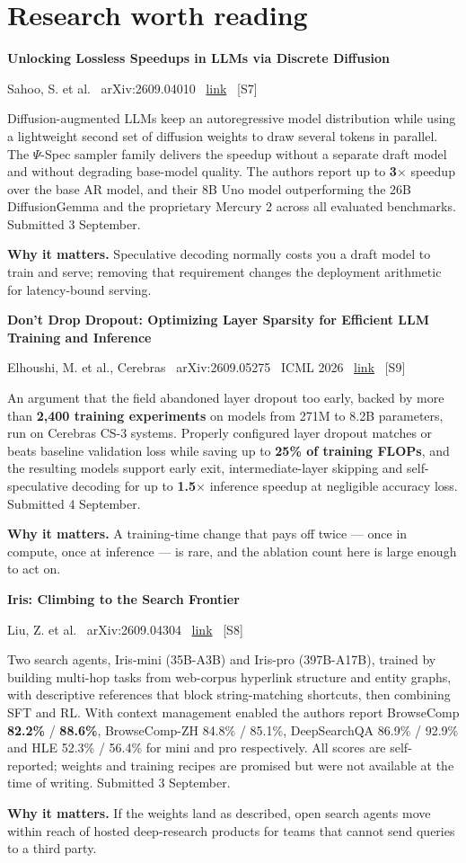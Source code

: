 \documentclass[11pt,a4paper]{article}
\newcommand{\entry}[4]{%
  \par\vspace{0.7em}%
  \Needspace*{5\baselineskip}%
  {\sffamily\bfseries\color{brandink}#1}\par
  {\footnotesize\color{brandgrey}#2 \textbullet\ \href{#3}{link} \textbullet\ \srcref{#4}}\par
  \vspace{0.15em}}
\newcommand{\why}[1]{\par{\small\textbf{Why it matters.} #1}\par}
\newcommand{\srcref}[1]{\textcolor{brandaccent}{[S#1]}}
\begin{document}
\section{Research worth reading}

\entry{Unlocking Lossless Speedups in LLMs via Discrete Diffusion}{Sahoo, S. et al. \textbullet\ arXiv:2609.04010}{https://arxiv.org/abs/2609.04010}{7}
Diffusion-augmented LLMs keep an autoregressive model distribution while using a
lightweight second set of diffusion weights to draw several tokens in parallel. The
$\Psi$-Spec sampler family delivers the speedup without a separate draft model and
without degrading base-model quality. The authors report up to \textbf{3$\times$} speedup
over the base AR model, and their 8B Uno model outperforming the 26B DiffusionGemma and
the proprietary Mercury 2 across all evaluated benchmarks. Submitted 3 September.
\why{Speculative decoding normally costs you a draft model to train and serve; removing
that requirement changes the deployment arithmetic for latency-bound serving.}

\entry{Don't Drop Dropout: Optimizing Layer Sparsity for Efficient LLM Training and Inference}{Elhoushi, M. et al., Cerebras \textbullet\ arXiv:2609.05275 \textbullet\ ICML 2026}{https://arxiv.org/abs/2609.05275}{9}
An argument that the field abandoned layer dropout too early, backed by more than
\textbf{2{,}400 training experiments} on models from 271M to 8.2B parameters, run on
Cerebras CS-3 systems. Properly configured layer dropout matches or beats baseline
validation loss while saving up to \textbf{25\% of training FLOPs}, and the resulting
models support early exit, intermediate-layer skipping and self-speculative decoding for
up to \textbf{1.5$\times$} inference speedup at negligible accuracy loss. Submitted
4 September.
\why{A training-time change that pays off twice --- once in compute, once at
inference --- is rare, and the ablation count here is large enough to act on.}

\entry{Iris: Climbing to the Search Frontier}{Liu, Z. et al. \textbullet\ arXiv:2609.04304}{https://arxiv.org/abs/2609.04304}{8}
Two search agents, Iris-mini (35B-A3B) and Iris-pro (397B-A17B), trained by building
multi-hop tasks from web-corpus hyperlink structure and entity graphs, with descriptive
references that block string-matching shortcuts, then combining SFT and RL. With context
management enabled the authors report BrowseComp \textbf{82.2\%} / \textbf{88.6\%},
BrowseComp-ZH 84.8\% / 85.1\%, DeepSearchQA 86.9\% / 92.9\% and HLE 52.3\% / 56.4\% for
mini and pro respectively. All scores are self-reported; weights and training recipes are
promised but were not available at the time of writing. Submitted 3 September.
\why{If the weights land as described, open search agents move within reach of hosted
deep-research products for teams that cannot send queries to a third party.}
\end{document}
